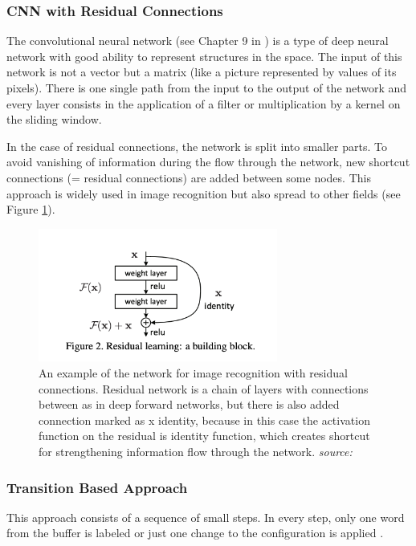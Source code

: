 \subsubsection{CNN with Residual Connections}
 The convolutional neural network (see Chapter 9 in \cite{DeeplearningBook}) is a type of deep neural network with good ability to represent structures in the space. The input of this network is not a vector but a matrix (like a picture represented by values of its pixels). There is one single path from the input to the output of the network and every layer consists in the application of a filter or multiplication by a kernel on the sliding window.
 \par
In the case of residual connections, the network is split into smaller parts. To avoid  vanishing of information during the flow through the network, new shortcut connections (= residual connections) are added between some nodes. This approach is widely used in image recognition but also spread to other fields (see Figure \ref{fig:resnet}).
\begin{figure}[h]
\centering
\includegraphics[width=0.7\textwidth]{diagrams/residual_connection.png}
\caption{
An example of the network for image recognition with residual connections. Residual network is a chain of layers with connections between as in deep forward networks, but there is also added connection marked as x identity, because in this case the activation function on the residual is identity function, which creates shortcut for strengthening information flow through the network.
\textit{source: \cite{DBLP}}}
\label{fig:resnet}
\end{figure}

\subsubsection{Transition Based Approach}
This approach consists of a sequence of small steps. In every step, only one word from the buffer is labeled or just one change to the configuration is applied \cite{daume2006practical}.

